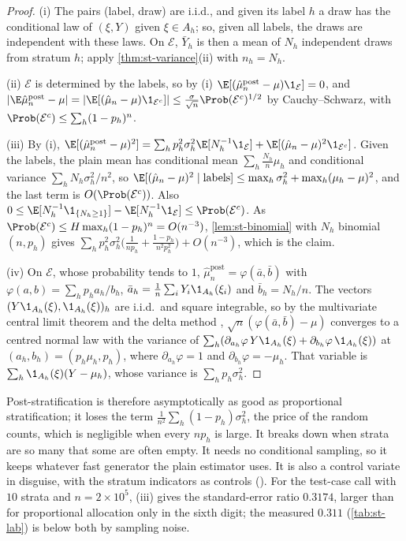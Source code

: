 \begin{proof}
(i) The pairs (label, draw) are i.i.d., and given its label $h$ a draw has the conditional
law of $(\xi,Y)$ given $\xi\in A_h$; so, given all labels, the draws are independent with
these laws. On $\mathcal E$, $\bar Y_h$ is then a mean of $N_h$ independent draws from
stratum $h$; apply \cref{thm:st-variance}(ii) with $n_h=N_h$.

(ii) $\mathcal E$ is determined by the labels, so by (i)
$\E[(\hat\mu^{\mathrm{post}}_n-\mu)\1_{\mathcal E}]=0$, and
$|\E\hat\mu^{\mathrm{post}}_n-\mu|=|\E[(\hat\mu_n-\mu)\1_{\mathcal E^c}]|\le\frac{\sigma}{\sqrt n}\Prob(\mathcal E^c)^{1/2}$
by Cauchy--Schwarz, with $\Prob(\mathcal E^c)\le\sum_h(1-p_h)^n$.

(iii) By (i),
$\E[(\hat\mu^{\mathrm{post}}_n-\mu)^2]=\sum_hp_h^2\sigma_h^2\E[N_h^{-1}\1_{\mathcal E}]
+\E[(\hat\mu_n-\mu)^2\1_{\mathcal E^c}]$. Given the labels, the plain mean has conditional
mean $\sum_h\frac{N_h}n\mu_h$ and conditional variance $\sum_hN_h\sigma_h^2/n^2$, so
$\E[(\hat\mu_n-\mu)^2\mid\text{labels}]\le\max_h\sigma_h^2+\max_h(\mu_h-\mu)^2$, and the last
term is $O(\Prob(\mathcal E^c))$. Also
$0\le\E[N_h^{-1}\1_{\{N_h\ge1\}}]-\E[N_h^{-1}\1_{\mathcal E}]\le\Prob(\mathcal E^c)$. As
$\Prob(\mathcal E^c)\le H\max_h(1-p_h)^n=O(n^{-3})$, \cref{lem:st-binomial} with $N_h$
binomial$(n,p_h)$ gives
$\sum_hp_h^2\sigma_h^2\big(\frac1{np_h}+\frac{1-p_h}{n^2p_h^2}\big)+O(n^{-3})$, which is the claim.

(iv) On $\mathcal E$, whose probability tends to $1$,
$\hat\mu^{\mathrm{post}}_n=\varphi(\bar a,\bar b)$ with $\varphi(a,b)=\sum_hp_ha_h/b_h$,
$\bar a_h=\frac1n\sum_iY_i\1_{A_h}(\xi_i)$ and $\bar b_h=N_h/n$. The vectors
$(Y\1_{A_h}(\xi),\1_{A_h}(\xi))_h$ are i.i.d.\ and square integrable, so by the multivariate
central limit theorem and the delta method \citep[Theorem~3.1]{vandervaart-asymptotic},
$\sqrt n(\varphi(\bar a,\bar b)-\mu)$ converges to a centred normal law with the variance of
$\sum_h(\partial_{a_h}\varphi\,Y\1_{A_h}(\xi)+\partial_{b_h}\varphi\,\1_{A_h}(\xi))$ at
$(a_h,b_h)=(p_h\mu_h,p_h)$, where $\partial_{a_h}\varphi=1$ and $\partial_{b_h}\varphi=-\mu_h$.
That variable is $\sum_h\1_{A_h}(\xi)(Y-\mu_h)$, whose variance is $\sum_hp_h\sigma_h^2$.
\end{proof}

Post-stratification is therefore asymptotically as good as proportional stratification;
it loses the term $\frac1{n^2}\sum_h(1-p_h)\sigma_h^2$, the price of the random counts,
which is negligible when every $np_h$ is large. It breaks down when strata are so many that
some are often empty. It needs no conditional sampling, so it keeps whatever fast generator
the plain estimator uses. It is also a control variate in disguise, with the stratum
indicators as controls (). For the test-case call with $10$ strata and
$n=2\times10^5$, (iii) gives the standard-error ratio $0.3174$, larger than for proportional
allocation only in the sixth digit; the measured $0.311$ (\cref{tab:st-lab}) is below both by
sampling noise.

